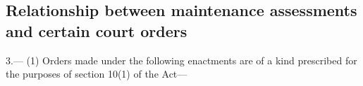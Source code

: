 \documentclass[a4paper]{article}
\begin{document}
\subsection[3. Relationship between maintenance assessments and certain court orders]{\sloppy Relationship between maintenance assessments and certain court orders}

3.—%
%
%
%
%
%
%
(1) Orders made under the following enactments are of a kind prescribed for the purposes of section 10(1) of the Act—
\end{document}

